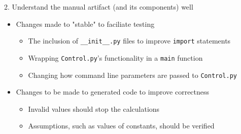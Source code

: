 \documentclass{beamer}
\begin{document}
\begin{frame}
    2. Understand the manual artifact (and its components) well
    \begin{itemize}
        \item<2-> Changes made to "stable" to faciliate testing
            \begin{itemize}
                \item The inclusion of \texttt{\_\_init\_\_.py} files to
                      improve \texttt{import} statements
                \item Wrapping \texttt{Control.py}'s functionality in a
                      \texttt{main} function
                \item Changing how command line parameters are
                      passed to \texttt{Control.py}
            \end{itemize}
        \item<3-> Changes to be made to generated code to improve correctness
            \begin{itemize}
                \item Invalid values should stop the calculations
                      \cite{projectile_current}
                \item Assumptions, such as values of constants, should be
                      verified
            \end{itemize}
    \end{itemize}

\end{frame}
\end{document}
